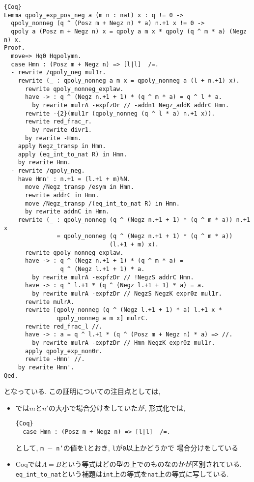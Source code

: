 \documentclass[11pt]{jarticle}
\theoremstyle{mystyle}
\newcommand{\0}{\textbf{0}}
\newcommand{\1}{\textbf{1}}
\newcommand{\2}{\textbf{2}}
\begin{document}
\begin{lstlisting}{Coq}
Lemma qpoly_exp_pos_neg a (m n : nat) x : q != 0 ->
  qpoly_nonneg (q ^ (Posz m + Negz n) * a) n.+1 x != 0 ->
  qpoly a (Posz m + Negz n) x = qpoly a m x * qpoly (q ^ m * a) (Negz n) x.
Proof.
  move=> Hq0 Hqpolymn.
  case Hmn : (Posz m + Negz n) => [l|l]  /=.
  - rewrite /qpoly_neg mul1r.
    rewrite (_ : qpoly_nonneg a m x = qpoly_nonneg a (l + n.+1) x).
      rewrite qpoly_nonneg_explaw.
      have -> : q ^ (Negz n.+1 + 1) * (q ^ m * a) = q ^ l * a.
        by rewrite mulrA -expfzDr // -addn1 Negz_addK addrC Hmn.
      rewrite -{2}(mul1r (qpoly_nonneg (q ^ l * a) n.+1 x)).
      rewrite red_frac_r.
        by rewrite divr1.
      by rewrite -Hmn.
    apply Negz_transp in Hmn.
    apply (eq_int_to_nat R) in Hmn.
    by rewrite Hmn.
  - rewrite /qpoly_neg.
    have Hmn' : n.+1 = (l.+1 + m)%N.
      move /Negz_transp /esym in Hmn.
      rewrite addrC in Hmn.
      move /Negz_transp /(eq_int_to_nat R) in Hmn.
      by rewrite addnC in Hmn.
    rewrite (_ : qpoly_nonneg (q ^ (Negz n.+1 + 1) * (q ^ m * a)) n.+1 x 
               = qpoly_nonneg (q ^ (Negz n.+1 + 1) * (q ^ m * a))
                              (l.+1 + m) x).
      rewrite qpoly_nonneg_explaw.
      have -> : q ^ (Negz n.+1 + 1) * (q ^ m * a) =
                q ^ (Negz l.+1 + 1) * a.
        by rewrite mulrA -expfzDr // !NegzS addrC Hmn.
      have -> : q ^ l.+1 * (q ^ (Negz l.+1 + 1) * a) = a.
        by rewrite mulrA -expfzDr // NegzS NegzK expr0z mul1r.
      rewrite mulrA.
      rewrite [qpoly_nonneg (q ^ (Negz l.+1 + 1) * a) l.+1 x *
               qpoly_nonneg a m x] mulrC.
      rewrite red_frac_l //.
      have -> : a = q ^ l.+1 * (q ^ (Posz m + Negz n) * a) => //.
        by rewrite mulrA -expfzDr // Hmn NegzK expr0z mul1r.
      apply qpoly_exp_non0r.
      rewrite -Hmn' //.
    by rewrite Hmn'.
Qed.
\end{lstlisting}
となっている. この証明についての注目点としては, 
\begin{itemize}
  \item \cite{Kac}では$m$と$n'$の大小で場合分けをしていたが, 形式化では, 
           \begin{lstlisting}{Coq}
  case Hmn : (Posz m + Negz n) => [l|l]  /=. \end{lstlisting}
           として, {\tt m $-$ n'}の値を{\tt l}とおき, {\tt l}が{\tt 0}以上かどうかで
           場合分けをしている
  \item Coqでは$A = B$という等式はどの型の上でのものなのかが区別されている. 
           {\tt eq\_int\_to\_nat}という補題は{\tt int}上の等式を{\tt nat}上の等式に写している. 
\end{itemize}
\end{document}
